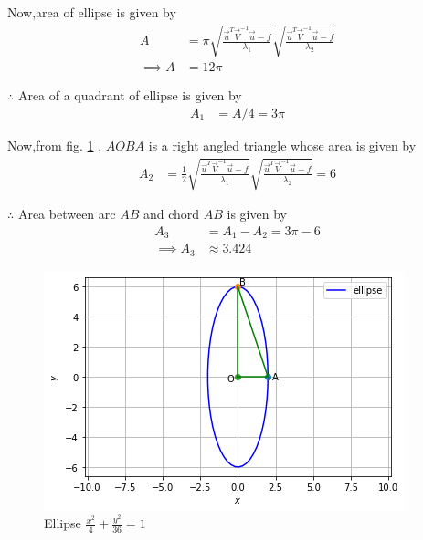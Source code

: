 \documentclass[journal,12pt,twocolumn]{IEEEtran}
\begin{document}
Now,area of ellipse is given by
\begin{align}
    A &= \pi \sqrt{\frac{ \vec{u}^T\vec{V}^{-1}\vec{u} - f}{\lambda_1}}\sqrt{\frac{ \vec{u}^T\vec{V}^{-1}\vec{u} - f}{\lambda_2}} 
    \\
    \implies A &= 12\pi
\end{align}

$\therefore$ Area of a quadrant of ellipse is given by
\begin{align}
    A_1 &= A/4 = 3\pi
\end{align}

Now,from fig. \ref{fig:ellipse} , $AOBA$ is a right angled triangle whose area is given by 
\begin{align}
    A_2 &= \frac{1}{2} \sqrt{\frac{ \vec{u}^T\vec{V}^{-1}\vec{u} - f}{\lambda_1}}\sqrt{\frac{ \vec{u}^T\vec{V}^{-1}\vec{u} - f}{\lambda_2}} = 6
\end{align}

$\therefore$ Area between arc $AB$ and chord $AB$ is given by
\begin{align}
    A_3 &= A_1 - A_2 = 3\pi -6
    \\
    \implies A_3 &\approx 3.424
\end{align}


\begin{figure}[!ht]
\centering
\includegraphics[width=\columnwidth]{Figure7}
\caption{Ellipse $\frac{x^2}{4} + \frac{y^2}{36} = 1$}
\label{fig:ellipse}	
\end{figure}
\end{document}
